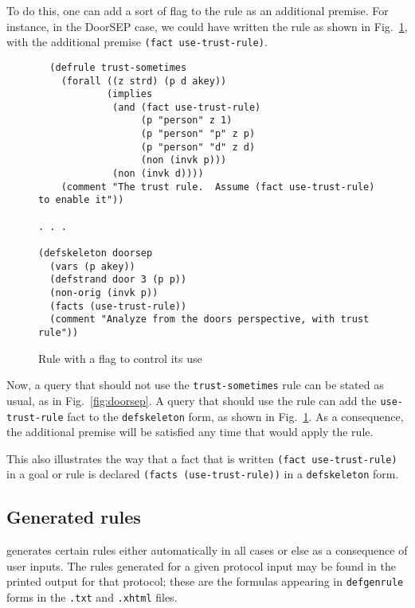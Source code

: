 To do this, one can add a sort of flag to the rule as an additional
premise.  For instance, in the DoorSEP case, we could have written the
rule as shown in Fig.~\ref{fig:doorsep:alt}, with the additional
premise \texttt{(fact use-trust-rule)}.  

\begin{figure}
  \centering
  \begin{verbatim}  (defrule trust-sometimes
    (forall ((z strd) (p d akey))
            (implies
             (and (fact use-trust-rule)
                  (p "person" z 1)
                  (p "person" "p" z p)
                  (p "person" "d" z d)
                  (non (invk p)))
             (non (invk d))))
    (comment "The trust rule.  Assume (fact use-trust-rule) to enable it"))

. . .

(defskeleton doorsep
  (vars (p akey))
  (defstrand door 3 (p p))
  (non-orig (invk p))
  (facts (use-trust-rule))
  (comment "Analyze from the doors perspective, with trust rule"))
\end{verbatim}
%
  \caption{Rule with a flag to control its use}
  \label{fig:doorsep:alt}
\end{figure}

Now, a query that should not use the \texttt{trust-sometimes} rule can
be stated as usual, as in Fig.~\ref{fig:doorsep}.  A query that should
use the rule can add the \texttt{use-trust-rule} fact to the
\texttt{defskeleton} form, as shown in Fig.~\ref{fig:doorsep:alt}.  As
a consequence, the additional premise will be satisfied any time that
{\cpsa} would apply the rule.

This also illustrates the way that a fact that is written
\texttt{(fact use-trust-rule)} in a goal or rule is declared
\texttt{(facts (use-trust-rule))} in a \texttt{defskeleton} form.

\subsection{Generated rules}
\label{sec:goals:rules:gen}

{\cpsa} generates certain rules either automatically in all cases or
else as a consequence of user inputs.  The rules generated for a given
protocol input may be found in the printed output for that protocol;
these are the formulas appearing in \texttt{defgenrule} forms in the
\texttt{.txt} and \texttt{.xhtml} files.

